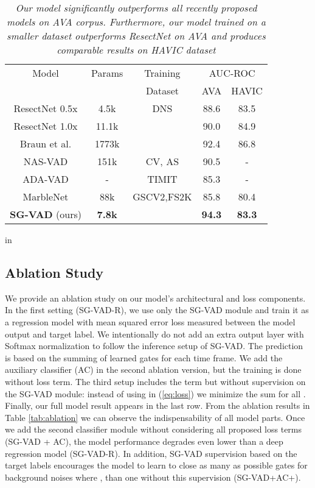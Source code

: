 \documentclass{article}
\begin{document}
\begin{table}[h!]
  \centering
  \small{
    \begin{tabular}{|c|c|c|c|c|}
    \hline
        Model & Params & Training & \multicolumn{2}{c|}{AUC-ROC}  \\
    
    & & Dataset & AVA & HAVIC\\
        \hline
       \hline
     ResectNet 0.5x \cite{kopuklu2022resectnet}& 4.5k & DNS  & 88.6 &  83.5 \\
    ResectNet 1.0x \cite{kopuklu2022resectnet} & 11.1k &  & 90.0 &  84.9 \\
    Braun et al. \cite{braun2021training} & 1773k &  & 92.4 & 86.8 \\
    \hline
    NAS-VAD \cite{rho2022vad} & 151k & CV, 
    AS & 90.5 & - \\
    \hline
    ADA-VAD \cite{kim2022ada}  & - & TIMIT  & 85.3 & - \\
    \hline
     MarbleNet \cite{jia2021marblenet} & 88k & GSCV2,FS2K & 85.8 & 80.4 \\
    \textbf{SG-VAD} (ours) & \textbf{7.8k} & & \textbf{94.3} & \textbf{83.3} \\
    \hline
    \end{tabular}
    }
  \caption{\textit{Our model significantly outperforms all recently proposed models on AVA corpus. Furthermore, our model trained on a smaller dataset outperforms ResectNet on AVA and produces comparable results on HAVIC dataset}} 
   \label{tab:results}
         in
\end{table}

\subsection{Ablation Study}
\label{sec:ablation}

We provide an ablation study on our model's architectural and loss components. In the first setting (SG-VAD-R), we use only the SG-VAD module and train it as a regression model with mean squared error loss measured between the model output and target label. We intentionally do not add an extra output layer with Softmax normalization to follow the inference setup of SG-VAD. The prediction is based on the summing of learned gates for each time frame.
We add the auxiliary classifier (AC) in the second ablation version, but the training is done without  loss term. The third setup includes the  term but without supervision on the SG-VAD module: instead of using  in (\ref{eq:loss}) we minimize the sum  for all . Finally, our full model result appears in the last row. From the ablation results in Table \ref{tab:ablation} we can observe the indispensability of all model parts. Once we add the second classifier module without considering all proposed loss terms (SG-VAD + AC), the model performance degrades even lower than a deep regression model (SG-VAD-R). In addition, SG-VAD supervision based on the target labels encourages the model to learn to close as many as possible gates for background noises where , than one without this supervision (SG-VAD+AC+).
\end{document}
